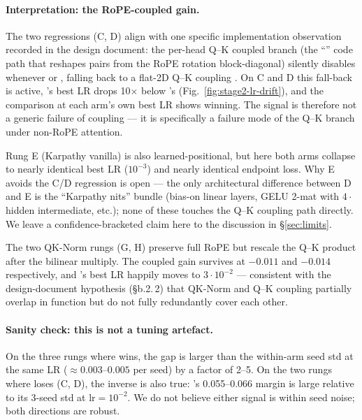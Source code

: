 \paragraph{Interpretation: the RoPE-coupled gain.}
The two regressions (C, D) align with one specific implementation observation recorded in the design document: the per-head Q--K coupled branch (the ``'' code path that reshapes  pairs from the RoPE rotation block-diagonal) silently disables whenever  or , falling back to a flat-2D Q--K coupling \citep{liu2025moonlight}. On C and D this fall-back is active, \optCoupled{}'s best LR drops 10$\times$ below \optMuon{}'s (Fig.~\ref{fig:stage2-lr-drift}), and the comparison at each arm's own best LR shows \optMuon{} winning. The signal is therefore not a generic failure of coupling --- it is specifically a failure mode of the Q--K branch under non-RoPE attention.

Rung E (Karpathy vanilla) is also learned-positional, but here both arms collapse to nearly identical best LR ($10^{-3}$) and nearly identical endpoint loss. Why E avoids the C/D regression is open --- the only architectural difference between D and E is the ``Karpathy nits'' bundle (bias-on linear layers, GELU 2-mat with $4\cdot$hidden intermediate, etc.); none of these touches the Q--K coupling path directly. We leave a confidence-bracketed claim here to the discussion in \S\ref{sec:limits}.

The two QK-Norm rungs (G, H) preserve full RoPE but rescale the Q--K product after the bilinear multiply. The coupled gain survives at $-0.011$ and $-0.014$\nats{} respectively, and \optCoupled{}'s best LR happily moves to $3\!\cdot\!10^{-2}$ --- consistent with the design-document hypothesis (\S b.2.\,2) that QK-Norm and Q--K coupling partially overlap in function but do not fully redundantly cover each other.

\paragraph{Sanity check: this is not a tuning artefact.}
On the three rungs where \optCoupled{} wins, the gap is larger than the within-arm seed std at the same LR ($\approx 0.003$--$0.005$\nats{} per seed) by a factor of 2--5. On the two rungs where \optCoupled{} loses (C, D), the inverse is also true: \optMuon{}'s 0.055--0.066\nats{} margin is large relative to its 3-seed std at $\mathrm{lr}{=}10^{-2}$. We do not believe either signal is within seed noise; both directions are robust.

